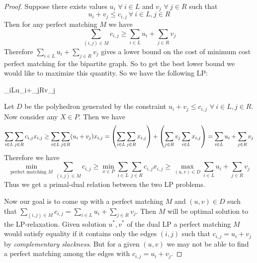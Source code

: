 \begin{proof}
	Suppose there exists values $u_i$ $\forall\ i\in L$ and $v_j$ $\forall\ j\in R$ such that $$u_i+v_j\leq c_{i,j}\ \forall\ i\in L, j\in R$$Then for any perfect matching $M$ we have $$\sum_{(i,j)\in M}c_{i,j}\geq \sum_{i\in L}u_i+\sum_{j\in R}v_j$$Therefore $\sum\limits_{i\in L}u_i+\sum\limits_{j\in R}v_j$ gives a lower bound on the cost of minimum cost perfect matching for the bipartite graph. So to get the best lower bound we would like to maximize this quantity. So we have the following LP:
	\begin{maxi*}{}{\sum_{i\in L}u_i+\sum_{j\in R}v_j}{}{}
	\end{maxi*}Let $D$ be the polyhedron generated by the constraint $u_i+v_j\leq c_{i,j}$ $\forall\ i\in L,j\in R$. Now consider any $X\in P$. Then we have $$\sum_{i\in L}\sum_{j\in R}c_{i,j}x_{i,j}\geq \sum_{i\in L}\sum_{j\in R}(u_i+v_j)x_{i,j}=\left(\sum_{i\in L}\sum_{j\in R}x_{i,j}\right)+\left(\sum_{j\in R}v_j\sum_{i\in L}x_{i,j}\right)=\sum_{i\in L}u_i+\sum_{j\in R}v_j$$Therefore we have $$\min\limits_{\text{perfect matching $M$}}\sum_{(i,j)\in M}c_{i,j}\geq \min\limits_{x\in P}\sum_{i\in L}\sum_{j\in R}c_{i,j}x_{i,j}\geq \max\limits_{(u,v)\in D}\sum_{i\in L}u_i+\sum_{j\in R}v_j$$Thus we get a primal-dual relation between the two LP problems.
	
	Now our goal is to come up with a perfect matching $M$ and $(u,v)\in D$ such that $\sum\limits_{(i,j)\in M}c_{i,j}=\sum\limits_{i\in L}u_i+\sum\limits_{j\in R}v_j$. Then $M$ will be optimal solution to the LP-relaxation. Given solution $u^*,v^*$ of the dual LP a perfect matching $M$ would satisfy equality if it contains only the edges $(i,j)$ such that $c_{i,j}=u_i+v_j$ by \textit{complementary slackness}. But for a given $(u,v)$ we may not be able to find a perfect matching among the edges with $c_{i,j}=u_i+v_j$. 
	

\end{proof}
